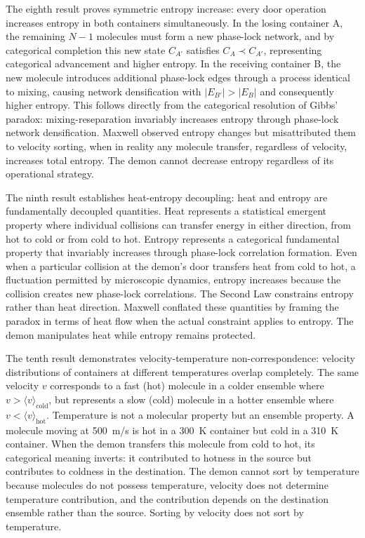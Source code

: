 \documentclass[12pt,a4paper]{article}
\theoremstyle{definition}
\theoremstyle{remark}
\begin{document}
The eighth result proves symmetric entropy increase: every door operation increases entropy in both containers simultaneously. In the losing container A, the remaining $N-1$ molecules must form a new phase-lock network, and by categorical completion this new state $C_{A'}$ satisfies $C_A \prec C_{A'}$, representing categorical advancement and higher entropy. In the receiving container B, the new molecule introduces additional phase-lock edges through a process identical to mixing, causing network densification with $|E_{B'}| > |E_B|$ and consequently higher entropy. This follows directly from the categorical resolution of Gibbs' paradox: mixing-reseparation invariably increases entropy through phase-lock network densification. Maxwell observed entropy changes but misattributed them to velocity sorting, when in reality any molecule transfer, regardless of velocity, increases total entropy. The demon cannot decrease entropy regardless of its operational strategy.

The ninth result establishes heat-entropy decoupling: heat and entropy are fundamentally decoupled quantities. Heat represents a statistical emergent property where individual collisions can transfer energy in either direction, from hot to cold or from cold to hot. Entropy represents a categorical fundamental property that invariably increases through phase-lock correlation formation. Even when a particular collision at the demon's door transfers heat from cold to hot, a fluctuation permitted by microscopic dynamics, entropy increases because the collision creates new phase-lock correlations. The Second Law constrains entropy rather than heat direction. Maxwell conflated these quantities by framing the paradox in terms of heat flow when the actual constraint applies to entropy. The demon manipulates heat while entropy remains protected.

The tenth result demonstrates velocity-temperature non-correspondence: velocity distributions of containers at different temperatures overlap completely. The same velocity $v$ corresponds to a fast (hot) molecule in a colder ensemble where $v > \langle v \rangle_{\text{cold}}$, but represents a slow (cold) molecule in a hotter ensemble where $v < \langle v \rangle_{\text{hot}}$. Temperature is not a molecular property but an ensemble property. A molecule moving at 500~m/s is hot in a 300~K container but cold in a 310~K container. When the demon transfers this molecule from cold to hot, its categorical meaning inverts: it contributed to hotness in the source but contributes to coldness in the destination. The demon cannot sort by temperature because molecules do not possess temperature, velocity does not determine temperature contribution, and the contribution depends on the destination ensemble rather than the source. Sorting by velocity does not sort by temperature.
\end{document}

